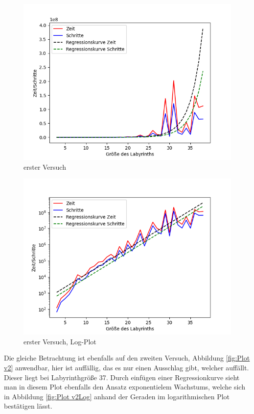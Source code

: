 \documentclass[11pt, a4paper]{article}
\begin{document}
\begin{figure}[h]
	\centering
	\includegraphics[scale=.5]{v1Aus.png}
	\caption{erster Versuch}
	\label{fig:Plot v1}
\end{figure}
\begin{figure}[t]
	\centering
	\includegraphics[scale=.5]{v1AusLog.png}
	\caption{erster Versuch, Log-Plot}
	\label{fig:Plot v1Log}
\end{figure}

\newpage

Die gleiche Betrachtung ist ebenfalls auf den zweiten Versuch, Abbildung \ref{fig:Plot v2} anwendbar, hier ist auffällig, das es nur einen Ausschlag gibt, welcher auffällt. Dieser liegt bei Labyrinthgröße 37. Durch einfügen einer Regressionkurve sieht man in diesem Plot ebenfalls den Ansatz exponentielem Wachstums, welche sich in Abbildung \ref{fig:Plot v2Log} anhand der Geraden im logarithmischen Plot bestätigen lässt.
\end{document}
